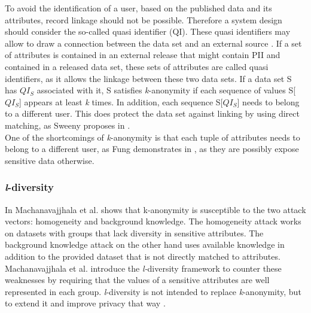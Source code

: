             \label{subsec:related:kanon}
            
            To avoid the identification of a user, based on the published data and its attributes, record linkage should not be possible. Therefore a system design should consider the so-called quasi identifier (QI). These quasi identifiers may allow to draw a connection between the data set and an external source \cite{sweeney_k-anonymity_2002}.
            If a set of attributes is contained in an external release that might contain PII and contained in a released data set, these sets of attributes are called quasi identifiers, as it allows the linkage between these two data sets.
            If a data set S has $QI_S$ associated with it, S satisfies \textit{k}-anonymity if each sequence of values S[$QI_S$] appears at least \textit{k} times. 
        	In addition, each sequence S[$QI_S$] needs to belong to a different user.
        	This does protect the data set against linking by using direct matching, as Sweeny proposes in  \cite{sweeney_k-anonymity_2002}.\\
            One of the shortcomings of \textit{k}-anonymity is that each tuple of attributes needs to belong to a different user, as Fung demonstrates in  \cite{fung_introduction_2011}, as they are possibly expose sensitive data otherwise.

        \subsubsection{\textit{l}-diversity}
            \label{subsec:related:l-div}
            
            In  \cite{machanavajjhala_l-diversity_2007} Machanavajjhala et al. shows that k-anonymity is susceptible to the two attack vectors: homogeneity and background knowledge.
            The homogeneity attack works on datasets with groups that lack diversity in sensitive attributes. The background knowledge attack on the other hand uses available knowledge in addition to the provided dataset that is not directly matched to attributes.\\
            Machanavajjhala et al. introduce the \textit{l-}diversity framework to counter these weaknesses by requiring that the values of a sensitive attributes are well represented in each group. \textit{l}-diversity is not intended to replace \textit{k}-anonymity, but to extend it and improve privacy that way  \cite{machanavajjhala_l-diversity_2007}.
            

